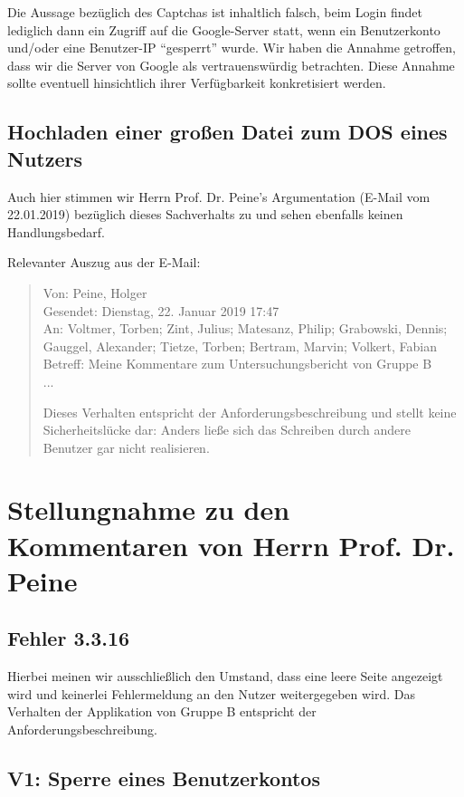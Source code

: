 \documentclass[12pt,DIV14,BCOR10mm,a4paper,parskip=half-,headsepline,headinclude,english,ngerman,bibliography=totocnumbered]{scrreprt}
\begin{document}
Die Aussage bezüglich des Captchas ist inhaltlich falsch, beim Login findet lediglich dann ein Zugriff auf die Google-Server statt, wenn ein Benutzerkonto und/oder eine Benutzer-IP \enquote{gesperrt} wurde.
Wir haben die Annahme getroffen, dass wir die Server von Google als vertrauenswürdig betrachten.
Diese Annahme sollte eventuell hinsichtlich ihrer Verfügbarkeit konkretisiert werden.

\section{Hochladen einer großen Datei zum DOS eines Nutzers}

Auch hier stimmen wir Herrn Prof. Dr. Peine's Argumentation (E-Mail vom 22.01.2019) bezüglich dieses Sachverhalts zu und sehen ebenfalls keinen Handlungsbedarf.

Relevanter Auszug aus der E-Mail:

\blockquote{
Von: Peine, Holger \\
Gesendet: Dienstag, 22. Januar 2019 17:47 \\
An: Voltmer, Torben; Zint, Julius; Matesanz, Philip; Grabowski, Dennis; Gauggel, Alexander; Tietze, Torben; Bertram, Marvin; Volkert, Fabian  \\
Betreff: Meine Kommentare zum Untersuchungsbericht von Gruppe B \\

...

Dieses Verhalten entspricht der Anforderungsbeschreibung und stellt
keine Sicherheitslücke dar: Anders ließe sich das Schreiben durch andere
Benutzer gar nicht realisieren.
}

\chapter{Stellungnahme zu den Kommentaren von Herrn Prof. Dr. Peine}

\section{Fehler 3.3.16}

Hierbei meinen wir ausschließlich den Umstand, dass eine leere Seite angezeigt wird und keinerlei Fehlermeldung an den Nutzer weitergegeben wird.
Das Verhalten der Applikation von Gruppe B entspricht der Anforderungsbeschreibung.

\section{V1: Sperre eines Benutzerkontos}
\end{document}
